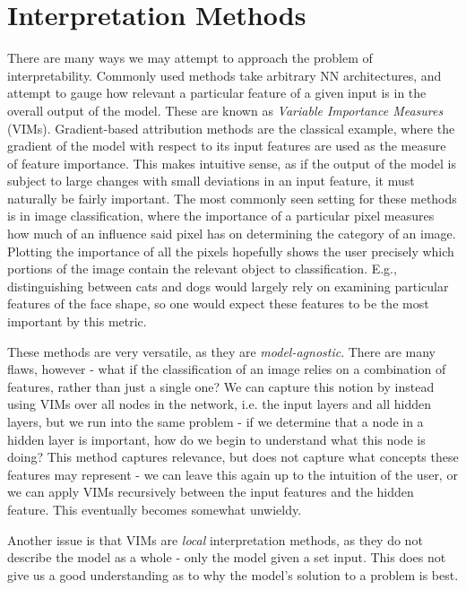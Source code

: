 \section{Interpretation Methods}
\label{section:vims}

There are many ways we may attempt to approach the problem of interpretability. Commonly used methods take arbitrary NN architectures, and attempt to gauge how relevant a particular feature of a given input is in the overall output of the model. These are known as \textit{Variable Importance Measures} (VIMs). Gradient-based attribution methods \cite{gradientattribute} are the classical example, where the gradient of the model with respect to its input features are used as the measure of feature importance. This makes intuitive sense, as if the output of the model is subject to large changes with small deviations in an input feature, it must naturally be fairly important. The most commonly seen setting for these methods is in image classification, where the importance of a particular pixel measures how much of an influence said pixel has on determining the category of an image. Plotting the importance of all the pixels hopefully shows the user precisely which portions of the image contain the relevant object to classification. E.g., distinguishing between cats and dogs would largely rely on examining particular features of the face shape, so one would expect these features to be the most important by this metric.

These methods are very versatile, as they are \textit{model-agnostic}. There are many flaws, however - what if the classification of an image relies on a combination of features, rather than just a single one? We can capture this notion by instead using VIMs over all nodes in the network, i.e. the input layers and all hidden layers, but we run into the same problem - if we determine that a node in a hidden layer is important, how do we begin to understand what this node is doing? This method captures relevance, but does not capture what concepts these features may represent - we can leave this again up to the intuition of the user, or we can apply VIMs recursively between the input features and the hidden feature. This eventually becomes somewhat unwieldy. 

Another issue is that VIMs are \textit{local} interpretation methods, as they do not describe the model as a whole - only the model given a set input. This does not give us a good understanding as to why the model's solution to a problem is best.

